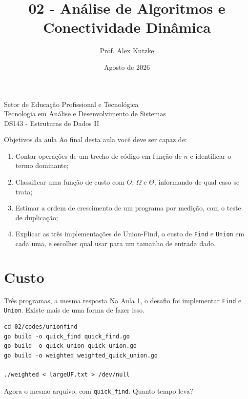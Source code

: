 \documentclass{beamer}
\title{02 - Análise de Algoritmos e Conectividade Dinâmica}
\author{Prof. Alex Kutzke}
\date{Agosto de 2026}
\begin{document}
\begin{frame}
	\begin{center}
		\large{Setor de Educação Profissional e Tecnológica}\\
		Tecnologia em Análise e Desenvolvimento de Sistemas\\
		\vspace{1cm}
		\small{DS143 - Estruturas de Dados II}
	\end{center}
	\titlepage
\end{frame}

\begin{frame}{Objetivos da aula}
	Ao final desta aula você deve ser capaz de:
	\begin{enumerate}
		\item Contar operações de um trecho de código em função de $n$ e
		      identificar o termo dominante;
		\item Classificar uma função de custo com $O$, $\Omega$ e $\Theta$,
		      informando de qual caso se trata;
		\item Estimar a ordem de crescimento de um programa por medição, com o
		      teste de duplicação;
		\item Explicar as três implementações de Union-Find, o custo de
		      \texttt{Find} e \texttt{Union} em cada uma, e escolher qual usar
		      para um tamanho de entrada dado.
	\end{enumerate}
\end{frame}

\section{Custo}

\begin{frame}[fragile]{Três programas, a mesma resposta}
	Na Aula 1, o desafio foi implementar \texttt{Find} e \texttt{Union}. Existe
	mais de uma forma de fazer isso.

	\begin{verbatim}
cd 02/codes/unionfind
go build -o quick_find quick_find.go
go build -o quick_union quick_union.go
go build -o weighted weighted_quick_union.go

./weighted < largeUF.txt > /dev/null
  \end{verbatim}

	\vspace{0.2cm}
	\begin{center}
		\Large Agora o mesmo arquivo, com \texttt{quick\_find}. Quanto tempo leva?
	\end{center}
\end{frame}
\end{document}
